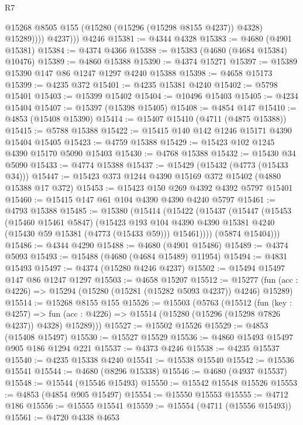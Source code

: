 \begin{lexlean}{R7}
\begin{coremodule}
              @15268 @8505 @155 (@15280 (@15296 (@15298 @8155 @4237)) @4328) @15289))))
          @4237)))
    @4246
@15381 := @4344 @4328
@15383 := @4680 (@4901 @15381)
@15384 := @4374 @4366
@15388 := @15383 (@4680 (@4684 @15384) @10476)
@15389 := @4860 @15388
@15390 := @4374 @15271
@15397 := @15389 @15390 @147 @86 @1247 @1297 @4240 @15388
@15398 := @4658 @15173
@15399 := @4235 @372
@15401 := @4235 @15381 @4240
@15402 := @5798 @15401
@15403 := @15399 @15402
@15404 := @10496 @15403
@15405 := @4234 @15404
@15407 := @15397 (@15398 @15405)
@15408 := @4854 @147
@15410 := @4853 (@15408 @15390)
@15414 := @15407 @15410 (@4711 (@4875 @15388))
@15415 := @5788 @15388
@15422 := @15415 @140 @142 @1246 @15171 @4390 @15404 @15405
@15423 := @4759 @15388
@15429 := @15423 @102 @1245 @4390 @15170 @5090 @15403
@15430 := @4768 @15388
@15432 := @15430 @34 @5090
@15433 := @4774 @15388
@15437 := @15429 (@15432 (@4773 (@15433 @34)))
@15447 := @15423 @373 @1244 @4390 @15169 @372 @15402 (@4880 @15388 @17 @372)
@15453 := @15423 @150 @269 @4392 @4392 @5797 @15401
@15460 := @15415 @147 @61 @104 @4390 @4390 @4240 @5797
@15461 := @4793 @15388
@15485 := @15380
    (@15414
      (@15422
        (@15437
          (@15447
            (@15453
              (@15460 @15461 @5847)
              (@15423
                @193
                @104
                @4390
                @4390
                @15381
                @4240
                (@15430 @59 @15381 (@4773 (@15433 @59)))
                @15461))))
        (@5874 @15404)))
@15486 := @4344 @4290
@15488 := @4680 (@4901 @15486)
@15489 := @4374 @5093
@15493 := @15488 (@4680 (@4684 @15489) @11954)
@15494 := @4831 @15493
@15497 := @4374 (@15280 @4246 @4237)
@15502 := @15494 @15497 @147 @86 @1247 @1297
@15503 := @4658 @15207
@15512 := @15277 (fun (acc : @4226) => @15294 (@15280 (@15281 (@15282 @5093 @4237)) @4246) @15289)
@15514 := @15268 @8155 @155
@15526 := @15503
    (@5763
      (@15512
        (fun (key : @4257) =>
        fun (acc : @4226) => @15514 (@15280 (@15296 (@15298 @7826 @4237)) @4328) @15289)))
@15527 := @15502 @15526
@15529 := @4853 (@15408 @15497)
@15530 := @15527 @15529
@15536 := @4860 @15493 @15497 @905 @186 @1294 @221
@15537 := @4373 @4246
@15538 := @4235 @15537
@15540 := @4235 @15338 @4240
@15541 := @15538 @15540
@15542 := @15536 @15541
@15544 := @4680 (@8296 @15338)
@15546 := @4680 (@4937 @15537)
@15548 := @15544 (@15546 @15493)
@15550 := @15542 @15548 @15526
@15553 := @4853 (@4854 @905 @15497)
@15554 := @15550 @15553
@15555 := @4712 @186
@15556 := @15555 @15541
@15559 := @15554 (@4711 (@15556 @15493))
@15561 := @4720 @4338 @4653

\end{coremodule}
\end{lexlean}
